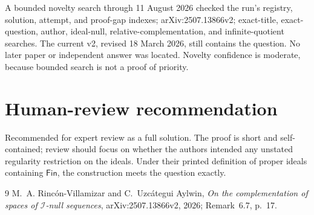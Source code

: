 \documentclass[10pt]{article}
\newcommand{\Fin}{\mathsf{Fin}}
\begin{document}
A bounded novelty search through 11 August 2026 checked the run's registry,
solution, attempt, and proof-gap indexes; arXiv:2507.13866v2; exact-title,
exact-question, author, ideal-null, relative-complementation, and
infinite-quotient searches.  The current v2, revised 18 March 2026, still
contains the question.  No later paper or independent answer was located.
Novelty confidence is moderate, because bounded search is not a proof of
priority.

\section{Human-review recommendation}

Recommended for expert review as a full solution.  The proof is short and
self-contained; review should focus on whether the authors intended any
unstated regularity restriction on the ideals.  Under their printed
definition of proper ideals containing $\Fin$, the construction meets the
question exactly.

\small
\begin{thebibliography}{9}
M.~A. Rinc\'on-Villamizar and C.~Uzc\'ategui Aylwin,
\emph{On the complementation of spaces of $\mathcal I$-null sequences},
arXiv:2507.13866v2, 2026; Remark~6.7, p.~17.
\end{thebibliography}
\end{document}
